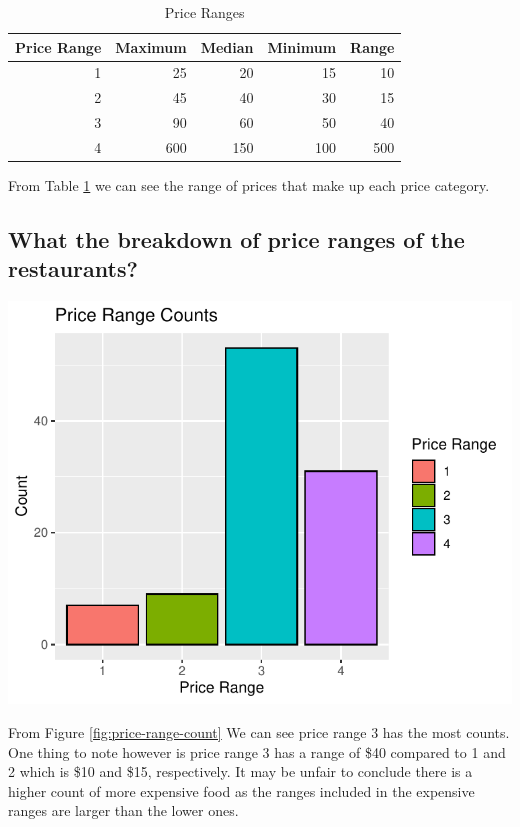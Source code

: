 \documentclass[11pt,a4paper,]{article}
\let\origfigure\figure
\let\endorigfigure\endfigure
\renewenvironment{figure}[1][2] {
    \expandafter\origfigure\expandafter[H]
} {
    \endorigfigure
}%
\begin{document}
\begin{table}[!h]

\caption{\label{tab:price-range-table}Price Ranges}
\centering
\begin{tabular}[t]{r|r|r|r|r}
\hline
Price Range & Maximum & Median & Minimum & Range\\
\hline
1 & 25 & 20 & 15 & 10\\
\hline
2 & 45 & 40 & 30 & 15\\
\hline
3 & 90 & 60 & 50 & 40\\
\hline
4 & 600 & 150 & 100 & 500\\
\hline
\end{tabular}
\end{table}

From Table \ref{tab:price-range-table} we can see the range of prices that make up each price category.

\hypertarget{what-the-breakdown-of-price-ranges-of-the-restaurants}{%
\subsection{What the breakdown of price ranges of the restaurants?}\label{what-the-breakdown-of-price-ranges-of-the-restaurants}}

\begin{figure}
\centering
\includegraphics{assignment4_files/figure-latex/price-range-count-1.pdf}
\caption{\label{fig:price-range-count}Price Range Counts}
\end{figure}

From Figure \ref{fig:price-range-count} We can see price range 3 has the most counts. One thing to note however is price range 3 has a range of \$40 compared to 1 and 2 which is \$10 and \$15, respectively. It may be unfair to conclude there is a higher count of more expensive food as the ranges included in the expensive ranges are larger than the lower ones.
\end{document}
